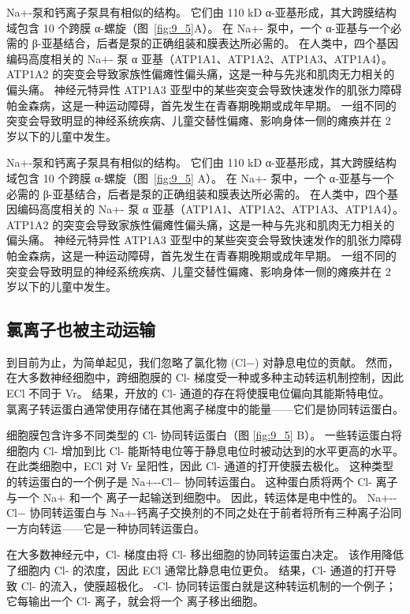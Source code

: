 Na+-泵和钙离子泵具有相似的结构。
它们由 110 kD α-亚基形成，其大跨膜结构域包含 10 个跨膜 α-螺旋（图~\ref{fig:9_5}A）。
在 Na+- 泵中，一个 α-亚基与一个必需的 β-亚基结合，后者是泵的正确组装和膜表达所必需的。
在人类中，四个基因编码高度相关的 Na+- 泵 α 亚基（ATP1A1、ATP1A2、ATP1A3、ATP1A4）。
ATP1A2 的突变会导致家族性偏瘫性偏头痛，这是一种与先兆和肌肉无力相关的偏头痛。
神经元特异性 ATP1A3 亚型中的某些突变会导致快速发作的肌张力障碍帕金森病，这是一种运动障碍，首先发生在青春期晚期或成年早期。
一组不同的突变会导致明显的神经系统疾病、儿童交替性偏瘫、影响身体一侧的瘫痪并在 2 岁以下的儿童中发生。


Na+-泵和钙离子泵具有相似的结构。
它们由 110 kD α-亚基形成，其大跨膜结构域包含 10 个跨膜 α-螺旋（图~\ref{fig:9_5} A）。
在 Na+- 泵中，一个 α-亚基与一个必需的 β-亚基结合，后者是泵的正确组装和膜表达所必需的。
在人类中，四个基因编码高度相关的 Na+- 泵 α 亚基（ATP1A1、ATP1A2、ATP1A3、ATP1A4）。 ATP1A2 的突变会导致家族性偏瘫性偏头痛，这是一种与先兆和肌肉无力相关的偏头痛。
神经元特异性 ATP1A3 亚型中的某些突变会导致快速发作的肌张力障碍帕金森病，这是一种运动障碍，首先发生在青春期晚期或成年早期。
一组不同的突变会导致明显的神经系统疾病、儿童交替性偏瘫、影响身体一侧的瘫痪并在 2 岁以下的儿童中发生。



\subsection{氯离子也被主动运输}
到目前为止，为简单起见，我们忽略了氯化物 (Cl−) 对静息电位的贡献。 
然而，在大多数神经细胞中，跨细胞膜的 Cl- 梯度受一种或多种主动转运机制控制，因此 ECl 不同于 Vr。 
结果，开放的 Cl- 通道的存在将使膜电位偏向其能斯特电位。 
氯离子转运蛋白通常使用存储在其他离子梯度中的能量——它们是协同转运蛋白。


细胞膜包含许多不同类型的 Cl- 协同转运蛋白（图 \ref{fig:9_5} B）。 
一些转运蛋白将细胞内 Cl- 增加到比 Cl- 能斯特电位等于静息电位时被动达到的水平更高的水平。 
在此类细胞中，ECl 对 Vr 呈阳性，因此 Cl- 通道的打开使膜去极化。 
这种类型的转运蛋白的一个例子是 Na+--Cl− 协同转运蛋白。 
这种蛋白质将两个 Cl- 离子与一个 Na+ 和一个  离子一起输送到细胞中。 
因此，转运体是电中性的。 
Na+--Cl− 协同转运蛋白与 Na+-钙离子交换剂的不同之处在于前者将所有三种离子沿同一方向转运——它是一种协同转运蛋白。


在大多数神经元中，Cl- 梯度由将 Cl- 移出细胞的协同转运蛋白决定。 
该作用降低了细胞内 Cl- 的浓度，因此 ECl 通常比静息电位更负。 
结果，Cl- 通道的打开导致 Cl- 的流入，使膜超极化。 
-Cl- 协同转运蛋白就是这种转运机制的一个例子； 它每输出一个 Cl- 离子，就会将一个  离子移出细胞。


